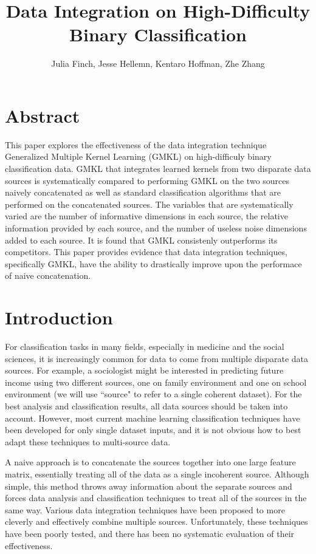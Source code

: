 \documentclass{article}
\begin{document}
\title{Data Integration on High-Difficulty Binary Classification}
\author{Julia Finch, Jesse Hellemn, Kentaro Hoffman, Zhe Zhang}
\maketitle


\section*{Abstract}

This paper explores the effectiveness of the data integration technique Generalized Multiple Kernel Learning (GMKL) on high-difficuly binary classification data. GMKL that integrates learned kernels from two disparate data sources is systematically compared to performing GMKL on the two sources naively concatenated as well as standard classification algorithms that are performed on the concatenated sources. The variables that are systematically varied are the number of informative dimensions in each source, the relative information provided by each source, and the number of useless noise dimensions added to each source. It is found that GMKL consistenly outperforms its competitors. This paper provides evidence that data integration techniques, specifically GMKL, have the ability to drastically improve upon the performace of naive concatenation. 

\section*{Introduction}
For classification tasks in many fields, especially in medicine and the social
sciences, it is increasingly common for data to come from multiple disparate
data sources. For example, a sociologist might be interested in predicting
future income using two different sources, one on family environment and one on
school environment (we will use ``source" to refer to a single coherent
dataset). For the best analysis and classification results, all data sources
should be taken into account. However, most current machine learning
classification techniques have been developed for only single dataset inputs,
and it is not obvious how to best adapt these techniques to multi-source data.

A naive approach is to concatenate the sources together into one large feature
matrix, essentially treating all of the data as a single incoherent source.
Although simple, this method throws away
information about the separate sources and forces data analysis and
classification techniques to treat all of the sources in the same way. Various
data integration techniques have been proposed to more cleverly and effectively
combine multiple sources. Unfortunately, these techniques have been poorly
tested, and there has been no systematic evaluation of their effectiveness.
\end{document}
